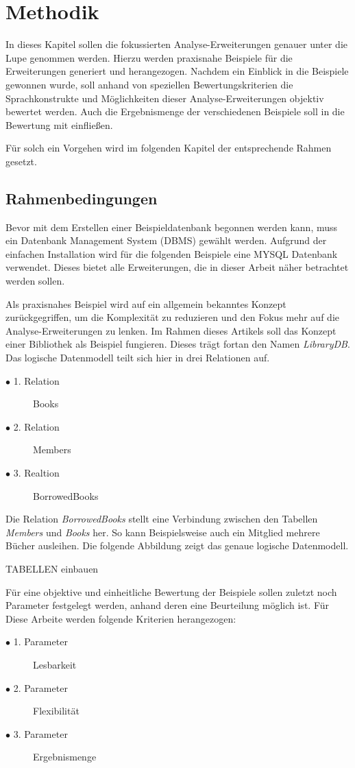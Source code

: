 \chapter{Methodik}
In dieses Kapitel sollen die fokussierten Analyse-Erweiterungen genauer unter die
Lupe genommen werden. Hierzu werden praxisnahe Beispiele für die Erweiterungen
generiert und herangezogen. Nachdem ein Einblick in die Beispiele gewonnen wurde,
soll anhand von speziellen Bewertungskriterien die Sprachkonstrukte und
Möglichkeiten dieser Analyse-Erweiterungen objektiv bewertet werden. Auch die Ergebnismenge
der verschiedenen Beispiele soll in die Bewertung mit einfließen.

Für solch ein Vorgehen wird im folgenden Kapitel der entsprechende Rahmen gesetzt.

\section{Rahmenbedingungen}
Bevor mit dem Erstellen einer Beispieldatenbank begonnen werden kann, muss ein
Datenbank Management System (DBMS) gewählt werden. Aufgrund der einfachen Installation
wird für die folgenden Beispiele eine MYSQL Datenbank verwendet. Dieses bietet
alle Erweiterungen, die in dieser Arbeit näher betrachtet werden sollen.

Als praxisnahes Beispiel wird auf ein allgemein bekanntes Konzept zurückgegriffen,
um die Komplexität zu reduzieren und den Fokus mehr auf die Analyse-Erweiterungen
zu lenken. Im Rahmen dieses Artikels soll das Konzept einer Bibliothek als Beispiel
fungieren. Dieses trägt fortan den Namen \textit{LibraryDB}. Das logische
Datenmodell teilt sich hier in drei Relationen auf.
\begin{description}
	\item[$\bullet$ 1. Relation] Books

	\item[$\bullet$ 2. Relation] Members

	\item[$\bullet$ 3. Realtion] BorrowedBooks
\end{description}

Die Relation \textit{BorrowedBooks} stellt eine Verbindung zwischen den Tabellen
\textit{Members} und \textit{Books} her. So kann Beispielsweise auch ein
Mitglied mehrere Bücher ausleihen. Die folgende Abbildung zeigt das genaue logische
Datenmodell.

TABELLEN einbauen

Für eine objektive und einheitliche Bewertung der Beispiele sollen zuletzt noch
Parameter festgelegt werden, anhand deren eine Beurteilung möglich ist. Für
Diese Arbeite werden folgende Kriterien herangezogen:
\begin{description}
	\item[$\bullet$ 1. Parameter] Lesbarkeit

	\item[$\bullet$ 2. Parameter] Flexibilität

	\item[$\bullet$ 3. Parameter] Ergebnismenge
\end{description}

